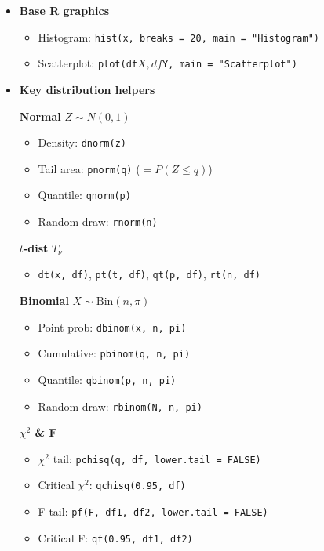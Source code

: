 \documentclass[12pt]{book}
\begin{document}
\begin{itemize}
\item \textbf{Base R graphics}
  \begin{itemize}
    \item Histogram: \texttt{hist(x, breaks = 20, main = "Histogram")}
    \item Scatterplot: \texttt{plot(df$X, df$Y, main = "Scatterplot")}
  \end{itemize}

\item \textbf{Key distribution helpers}

  \textbf{Normal} $Z\sim N(0,1)$
  \begin{itemize}
    \item Density: \texttt{dnorm(z)}
    \item Tail area: \texttt{pnorm(q)} ($=P(Z\le q)$)
    \item Quantile: \texttt{qnorm(p)}
    \item Random draw: \texttt{rnorm(n)}
  \end{itemize}

  \textbf{$t$-dist} $T_\nu$
  \begin{itemize}
    \item \texttt{dt(x, df)}, \texttt{pt(t, df)}, \texttt{qt(p, df)}, \texttt{rt(n, df)}
  \end{itemize}

  \textbf{Binomial} $X\sim\mathrm{Bin}(n,\pi)$
  \begin{itemize}
    \item Point prob: \texttt{dbinom(x, n, pi)}
    \item Cumulative: \texttt{pbinom(q, n, pi)}
    \item Quantile: \texttt{qbinom(p, n, pi)}
    \item Random draw: \texttt{rbinom(N, n, pi)}
  \end{itemize}

  \textbf{$\chi^2$ \& F}
  \begin{itemize}
    \item $\chi^2$ tail: \texttt{pchisq(q, df, lower.tail = FALSE)}
    \item Critical $\chi^2$: \texttt{qchisq(0.95, df)}
    \item F tail: \texttt{pf(F, df1, df2, lower.tail = FALSE)}
    \item Critical F: \texttt{qf(0.95, df1, df2)}
  \end{itemize}


\end{itemize}
\end{document}
